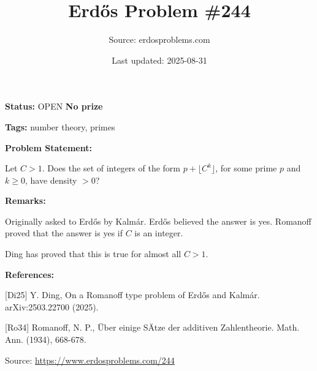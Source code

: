 \documentclass{article}
\title{Erd\H{o}s Problem \#244}
\date{Last updated: 2025-08-31}
\author{Source: erdosproblems.com}
\begin{document}
\maketitle

\noindent\textbf{Status:} OPEN \quad \textbf{No prize}

\noindent\textbf{Tags:} number theory, primes

\medskip
\noindent\textbf{Problem Statement:}

Let $C>1$. Does the set of integers of the form $p+\lfloor C^k\rfloor$, for some prime $p$ and $k\geq 0$, have density $>0$?

\bigskip
\noindent\textbf{Remarks:}

Originally asked to Erd\H{o}s by Kalm\'{a}r. Erd\H{o}s believed the answer is yes. Romanoff \cite{Ro34} proved that the answer is yes if $C$ is an integer.

Ding \cite{Di25} has proved that this is true for almost all $C>1$.

\bigskip
\noindent\textbf{References:}

[Di25] Y. Ding, On a Romanoff type problem of Erd\H{o}s and Kalm\'{a}r. arXiv:2503.22700 (2025).
 
 [Ro34] Romanoff, N. P., \"{U}ber einige S\"Atze der additiven Zahlentheorie. Math. Ann. (1934), 668-678.

\bigskip
\noindent\small{Source: \url{https://www.erdosproblems.com/244}}
\end{document}
